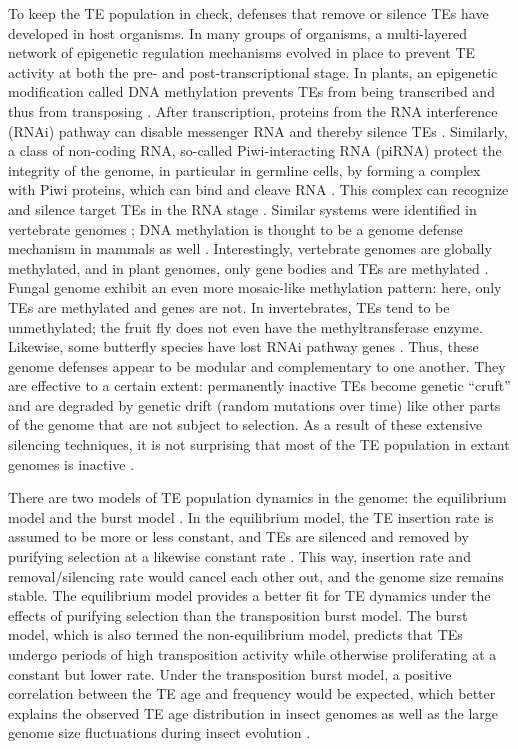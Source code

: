 To keep the TE population in check, defenses that remove or silence TEs
have developed in host organisms. In many groups of organisms, a
multi-layered network of epigenetic regulation mechanisms evolved in
place to prevent TE activity at both the pre- and post-transcriptional
stage. In plants, an epigenetic modification called DNA methylation
prevents TEs from being transcribed and thus from transposing
\citep{Slotkin2007, Lisch2009}. After transcription, proteins from the
RNA interference (RNAi) pathway can disable messenger RNA and thereby
silence TEs \citep{Buchon2006}. Similarly, a class of non-coding RNA,
so-called Piwi-interacting RNA (piRNA) protect the integrity of the
genome, in particular in germline cells, by forming a complex with Piwi
proteins, which can bind and cleave RNA \citep{Zeng2011}. This complex
can recognize and silence target TEs in the RNA stage \citep{Siomi2011, Mondal2018}.
Similar systems were identified in vertebrate genomes \citep{Suzuki2008,
Schubeler2015}; DNA methylation is thought to be a genome defense
mechanism in mammals as well \citep{Yoder1997}. Interestingly,
vertebrate genomes are globally methylated, and in plant genomes, only
gene bodies and TEs are methylated \citep{Suzuki2008}. Fungal genome
exhibit an even more mosaic-like methylation pattern: here, only TEs are
methylated and genes are not. In invertebrates, TEs tend to be
unmethylated; the fruit fly  does not
even have the methyltransferase enzyme. Likewise, some butterfly species
have lost RNAi pathway genes \citep{Pauli2016}. Thus, these genome
defenses appear to be modular and complementary to one another. They are
effective to a certain extent: permanently inactive TEs become genetic
``cruft'' and are degraded by genetic drift (random mutations over time)
like other parts of the genome that are not subject to selection. As a
result of these extensive silencing techniques, it is not surprising
that most of the TE population in extant genomes is inactive
\citep{Yoder1997, Zilberman2007}.

There are two models of TE population dynamics in the genome: the
equilibrium model and the burst model \citep{Petrov2011, Kofler2012,
Cridland2013, Blumenstiel2014}. In the equilibrium model, the TE
insertion rate is assumed to be more or less constant, and TEs are
silenced and removed by purifying selection at a likewise constant rate
\citep{Charlesworth1983}. This way, insertion rate and removal/silencing
rate would cancel each other out, and the genome size remains stable.
The equilibrium model provides a better fit for TE dynamics
under the effects of purifying selection \citep{Barron2014} than the
transposition burst model. The burst model, which is also termed the
non-equilibrium model, predicts that TEs undergo periods of high
transposition activity while otherwise proliferating at a constant but
lower rate. Under the transposition burst model, a positive correlation
between the TE age and frequency would be expected, which better
explains the observed TE age distribution in insect genomes as well as
the large genome size fluctuations during insect evolution
\citep{Alfsnes2017, Petersen2018}. 
